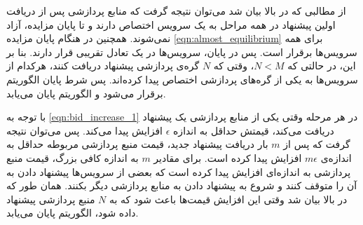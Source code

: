       از مطالبی که در بالا بیان شد می‌توان نتیجه گرفت که منابع پردازشی پس از دریافت اولین پیشنهاد در همه مراحل به یک سرویس اختصاص دارند و تا پایان مزایده، آزاد نمی‌شوند.
      همچنین در هنگام پایان مزایده \cref{eqn:almost_equilibrium} برای همه سرویس‌ها برقرار است.
      پس در پایان، سرویس‌ها در یک تعادل تقریبی قرار دارند.
      بنا بر این، در حالتی که $N<M$، وقتی که $N$ گره‌ی پردازشی پیشنهاد دریافت کنند، هرکدام از سرویس‌ها به یکی از گره‌های پردازشی اختصاص پیدا کرده‌اند.
      پس شرط پایان الگوریتم برقرار می‌شود و الگوریتم پایان می‌یابد.

      با توجه به \cref{eqn:bid_increase_1} در هر مرحله وقتی یکی از منابع پردازشی یک پیشنهاد دریافت می‌کند، قیمتش حداقل به اندازه $\epsilon$ افزایش پیدا می‌کند.
      پس می‌توان نتیجه گرفت که پس از $m$ بار دریافت پیشنهاد جدید، قیمت منبع پردازشی مربوطه حداقل به اندازه‌ی $m\epsilon$ افزایش پیدا کرده است.
      برای مقادیر $m$ به اندازه کافی بزرگ، قیمت منبع پردازشی به اندازه‌ای افزایش پیدا کرده است که بعضی از سرویس‌ها پیشنهاد دادن به آن را متوقف کنند و شروع به پیشنهاد دادن به منابع پردازشی دیگر بکنند.
      همان طور که در بالا بیان شد وقتی این افزایش قیمت‌ها باعث شود که به $N$ منبع پردازشی پیشنهاد داده شود، الگوریتم پایان می‌یابد.
